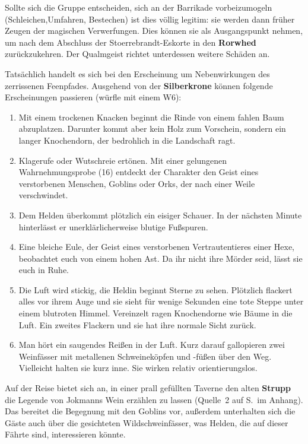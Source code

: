 Sollte sich die Gruppe entscheiden, sich an der Barrikade vorbeizumogeln (Schleichen,Umfahren, Bestechen) ist dies völlig legitim:
sie werden dann früher Zeugen der magischen Verwerfungen.
Dies können sie als Ausgangspunkt nehmen, um nach dem Abschluss der Stoerrebrandt-Eskorte in den \textbf{Rorwhed} zurückzukehren.
Der Qualmgeist richtet unterdessen weitere Schäden an.

Tatsächlich handelt es sich bei den Erscheinung um Nebenwirkungen des zerrissenen Feenpfades.
Ausgehend von der \textbf{Silberkrone} können folgende Erscheinungen passieren (würfle mit einem W6):
\begin{enumerate}
\item Mit einem trockenen Knacken beginnt die Rinde von einem fahlen
Baum abzuplatzen. Darunter kommt aber kein Holz zum Vorschein,
sondern ein langer Knochendorn, der bedrohlich in die
Landschaft ragt.

\item Klagerufe oder Wutschreie ertönen. Mit einer gelungenen
Wahrnehmungsprobe (16) entdeckt der Charakter den Geist eines
verstorbenen Menschen, Goblins oder Orks, der nach einer Weile
verschwindet.

\item Dem Helden überkommt plötzlich ein eisiger Schauer. In der
nächsten Minute hinterlässt er unerklärlicherweise blutige
Fußspuren.

\item Eine bleiche Eule, der Geist eines verstorbenen Vertrautentieres
einer Hexe, beobachtet euch von einem hohen Ast. Da ihr nicht
ihre Mörder seid, lässt sie euch in Ruhe.

\item Die Luft wird stickig, die Heldin beginnt Sterne zu sehen.
Plötzlich flackert alles vor ihrem Auge und sie sieht für
wenige Sekunden eine tote Steppe unter einem blutroten Himmel.
Vereinzelt ragen Knochendorne wie Bäume in die Luft. Ein
zweites Flackern und sie hat ihre normale Sicht zurück.

\item Man hört ein saugendes Reißen in der Luft. Kurz darauf
gallopieren zwei Weinfässer mit metallenen Schweineköpfen und
-füßen über den Weg. Vielleicht halten sie kurz inne. Sie
wirken relativ orientierungslos.
\end{enumerate}
\begin{center}
\end{center}

Auf der Reise bietet sich an, in einer prall gefüllten Taverne den alten \textbf{Strupp} die Legende von Jokmanns Wein erzählen zu lassen (Quelle~2 auf S.\,\pageref{aiw_quelle2} im Anhang).
Das bereitet die Begegnung mit den Goblins vor, außerdem unterhalten sich die Gäste auch über die gesichteten Wildschweinfässer, was Helden, die auf dieser Fährte sind, interessieren könnte.

